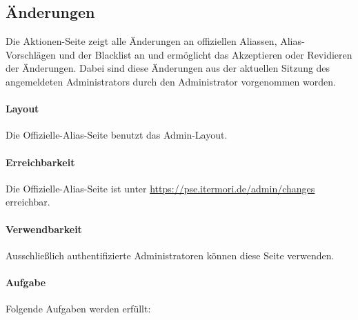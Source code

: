 \newpage
\subsection{Änderungen}

Die Aktionen-Seite zeigt alle Änderungen an offiziellen Aliassen, Alias-Vorschlägen und der Blacklist an und ermöglicht das Akzeptieren oder Revidieren der Änderungen.
Dabei sind diese Änderungen aus der aktuellen Sitzung des angemeldeten Administrators durch den Administrator vorgenommen worden.

\paragraph*{Layout}
Die Offizielle-Alias-Seite benutzt das Admin-Layout.

\paragraph*{Erreichbarkeit}
Die Offizielle-Alias-Seite ist unter \href{https://pse.itermori.de/admin/changes}{https://pse.itermori.de/admin/changes} erreichbar.

\paragraph*{Verwendbarkeit}
Ausschließlich authentifizierte Administratoren können diese Seite verwenden.

\paragraph*{Aufgabe}
Folgende Aufgaben werden erfüllt:

